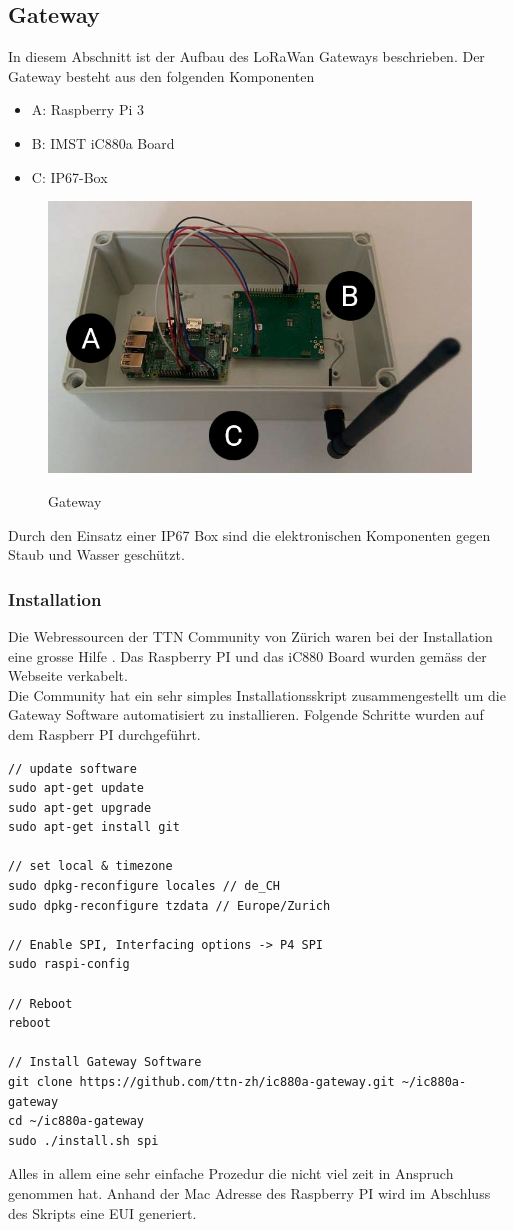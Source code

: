 \documentclass[11pt,english,german]{report}
\theoremstyle{definition}
\begin{document}
\subsection{Gateway}
In diesem Abschnitt ist der Aufbau des LoRaWan Gateways beschrieben. Der Gateway besteht aus den folgenden Komponenten
\begin{itemize}
	\item A: Raspberry Pi 3
	\item B: IMST iC880a Board \cite{ic880}
	\item C: IP67-Box
\end{itemize}
\begin{figure}[h]
	\centering
	\includegraphics[width=\textwidth]{img/gateway/gateway.jpg}\\[0.3cm]
	\caption[Gateway]
	{Gateway}
\end{figure}
Durch den Einsatz einer IP67 Box sind die elektronischen Komponenten gegen Staub und Wasser geschützt.

\newpage
\subsubsection{Installation}
Die Webressourcen der TTN Community von Zürich waren bei der Installation eine grosse Hilfe \cite{ttnzürich}. Das Raspberry PI und das iC880 Board wurden gemäss der Webseite verkabelt.\\[0.3cm]
Die Community hat ein sehr simples Installationsskript zusammengestellt um die Gateway Software automatisiert zu installieren. Folgende Schritte wurden auf dem Raspberr PI durchgeführt.
\lstset{language=C++}
\begin{lstlisting}
// update software
sudo apt-get update
sudo apt-get upgrade
sudo apt-get install git

// set local & timezone
sudo dpkg-reconfigure locales // de_CH
sudo dpkg-reconfigure tzdata // Europe/Zurich

// Enable SPI, Interfacing options -> P4 SPI
sudo raspi-config

// Reboot
reboot

// Install Gateway Software
git clone https://github.com/ttn-zh/ic880a-gateway.git ~/ic880a-gateway
cd ~/ic880a-gateway
sudo ./install.sh spi
\end{lstlisting}
Alles in allem eine sehr einfache Prozedur die nicht viel zeit in Anspruch genommen hat. Anhand der Mac Adresse des Raspberry PI wird im Abschluss des Skripts eine EUI generiert.
\newpage
\end{document}
